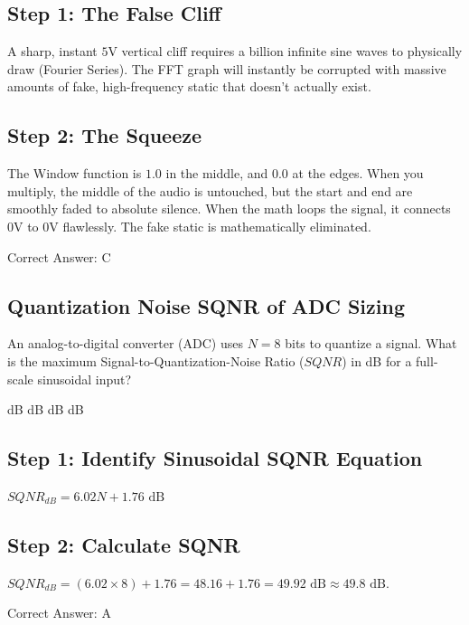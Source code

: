 \begin{solution}

\subsection*{Step 1: The False Cliff}
A sharp, instant $5\text{V}$ vertical cliff requires a billion infinite sine waves to physically draw (Fourier Series). The FFT graph will instantly be corrupted with massive amounts of fake, high-frequency static that doesn't actually exist.

\subsection*{Step 2: The Squeeze}
The Window function is $1.0$ in the middle, and $0.0$ at the edges. When you multiply, the middle of the audio is untouched, but the start and end are smoothly faded to absolute silence. When the math loops the signal, it connects $0\text{V}$ to $0\text{V}$ flawlessly. The fake static is mathematically eliminated.

Correct Answer: C
\end{solution}

\clearpage

\subsection{Quantization Noise SQNR of ADC Sizing}

An analog-to-digital converter (ADC) uses $N = 8$ bits to quantize a signal. What is the maximum Signal-to-Quantization-Noise Ratio ($SQNR$) in dB for a full-scale sinusoidal input?

\begin{choices}
     dB
     dB
     dB
     dB
\end{choices}

\begin{solution}

\subsection*{Step 1: Identify Sinusoidal SQNR Equation}
$SQNR_{dB} = 6.02 N + 1.76\text{ dB}$

\subsection*{Step 2: Calculate SQNR}
$SQNR_{dB} = (6.02 \times 8) + 1.76 = 48.16 + 1.76 = 49.92\text{ dB} \approx 49.8\text{ dB}$.

Correct Answer: A
\end{solution}

